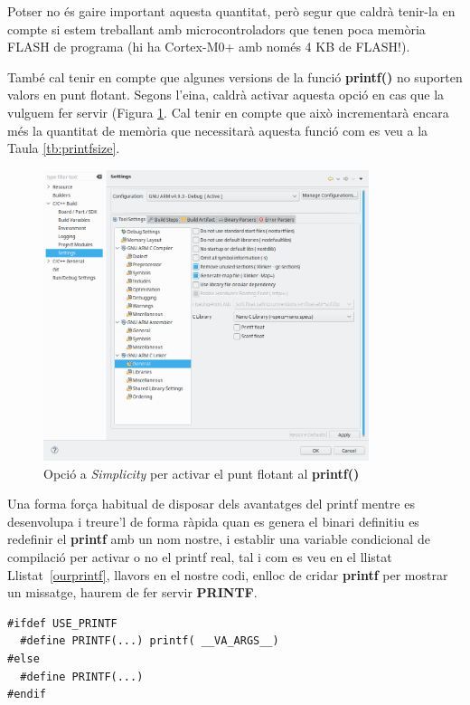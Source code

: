 Potser no és gaire important aquesta quantitat, però segur que caldrà tenir-la en compte si estem treballant amb microcontroladors que tenen poca memòria FLASH de programa (hi ha Cortex-M0+ amb només 4 KB de \gls{FLASH}!).

També cal tenir en compte que algunes versions de la funció {\bf printf()} no suporten valors en punt flotant. Segons l'eina, caldrà activar aquesta opció en cas que la vulguem fer servir (Figura \ref{fig:SILabsPrintfFloat}. Cal tenir en compte que això incrementarà encara més la quantitat de memòria que necessitarà aquesta funció com es veu a la Taula \ref{tb:printfsize}.

\begin{figure}[htb]
 \centering
 \includegraphics[width=0.85\textwidth, keepaspectratio]{imatges/SilabsPrintfFloat.png}
 \caption{Opció a {\em Simplicity} per activar el punt flotant al {\bf printf()}}
 \label{fig:SILabsPrintfFloat}
\end{figure}

Una forma força habitual de disposar dels avantatges del printf
mentre es desenvolupa i treure'l de forma ràpida quan es genera el
binari definitiu es redefinir el \textbf{printf} amb un nom nostre, i
establir una variable condicional de compilació per activar o no el
printf real, tal i com es veu en el llistat Llistat~\ref{ourprintf},
llavors en el nostre codi, enlloc de cridar \textbf{printf} per
mostrar un missatge, haurem de fer servir \textbf{PRINTF}.

\begin{lstlisting}[caption={Redefenir {\bf printf()}},style=customc,label=ourprintf]
#ifdef USE_PRINTF
  #define PRINTF(...) printf( __VA_ARGS__)
#else
  #define PRINTF(...)
#endif
\end{lstlisting}

